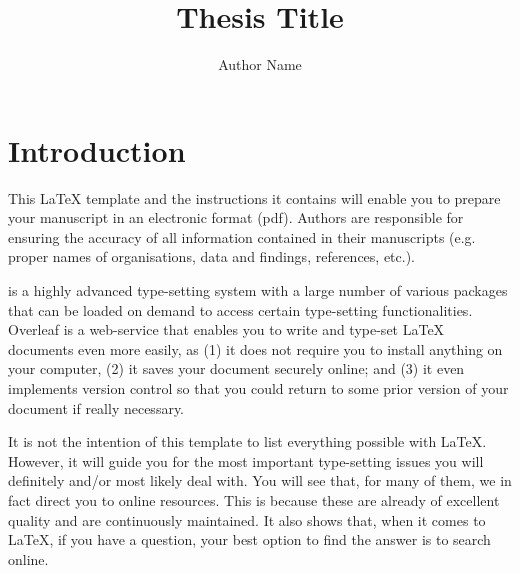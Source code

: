 \documentclass[11pt,twoside,openright]{report}
\title{Thesis Title}
\author{Author Name}
\date{\the\year{}}
\begin{document}
\doublespacing



\maketitle








\chapter{Introduction}
\label{ch:introduction}

This \LaTeX{} template and the instructions it contains will enable you to prepare your manuscript in an electronic format (pdf). 
Authors are responsible for ensuring the accuracy of all information contained in their manuscripts (e.g. proper names of organisations, data and findings, references, etc.).

 is a highly advanced type-setting system with a large number of various packages that can be loaded on demand to access certain type-setting functionalities.
Overleaf is a web-service that enables you to write and type-set \LaTeX{} documents even more easily, as (1) it does not require you to install anything on your computer, (2) it saves your document securely online; and (3) it even implements version control so that you could return to some prior version of your document if really necessary.

It is not the intention of this template to list everything possible with \LaTeX. 
However, it will guide you for the most important type-setting issues you will definitely and/or most likely deal with.
You will see that, for many of them, we in fact direct you to online resources. This is because these are already of excellent quality and are continuously maintained. It also shows that, when it comes to \LaTeX{}, if you have a question, your best option to find the answer is to search online.
\end{document}
